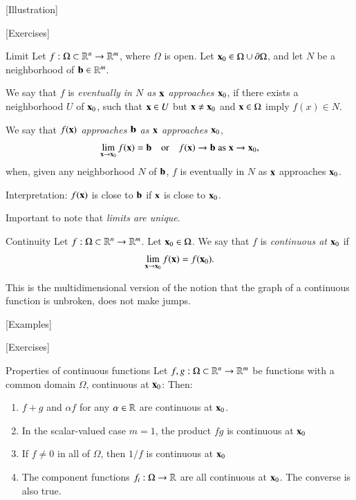 [Illustration]

[Exercises]

\begin{myDefinition}{Limit}{}
    Let $f : \Omega \subset \mathbb{R}^n \to \mathbb{R}^m$, where $\Omega$ is open. Let $\mathbf{x}_0\in \Omega \cup \partial\Omega$, and let $N$ be a neighborhood of $\mathbf{b}\in \mathbb{R}^m$.

    We say that $f$ is \emph{eventually in $N$ as $\mathbf{x}$ approaches $\mathbf{x}_0$}, if there exists a neighborhood $U$ of $\mathbf{x}_0$, such that $\mathbf{x}
    \in U$ but $\mathbf{x}\neq\mathbf{x}_0$ and $\mathbf{x}\in \Omega$ imply $f(x)\in N$.

    We say that \emph{$f(\mathbf{x})$ approaches $\mathbf{b}$ as $\mathbf{x}$ approaches $\mathbf{x}_0$},
    \begin{equation}
        \lim_{\mathbf{x}\to\mathbf{x}_0} f(\mathbf{x}) = \mathbf{b} \quad\text{or}\quad f(\mathbf{x}) \to \mathbf{b} \; \text{as} \; \mathbf{x}\to\mathbf{x}_0,
    \end{equation}
    when, given any neighborhood $N$ of $\mathbf{b}$, $f$ is eventually in $N$ as $\mathbf{x}$ approaches $\mathbf{x}_0$.
\end{myDefinition}

Interpretation: $f(\mathbf{x})$ is close to $\mathbf{b}$ if $\mathbf{x}$ is close to $\mathbf{x}_0$.

Important to note that \emph{limits are unique}.

\begin{myDefinition}{Continuity}{}
    Let $f : \Omega \subset \mathbb{R}^n\to\mathbb{R}^m$. Let $\mathbf{x}_0\in\Omega$. We say that $f$ is \emph{continuous at $\mathbf{x}_0$} if
    \begin{equation}
        \lim_{\mathbf{x}\to\mathbf{x}_0} f(\mathbf{x}) = f(\mathbf{x}_0).
    \end{equation}
\end{myDefinition}

This is the multidimensional version of the notion that the graph of a continuous function is unbroken, does not make jumps.

[Examples]

[Exercises]

\begin{myTheorem}{Properties of continuous functions}{}
Let $f, g : \Omega\subset\mathbb{R}^n \to \mathbb{R}^m$ be functions with a common domain $\Omega$, continuous at $\mathbf{x}_0$:
Then:
\begin{enumerate}
    \item $f+g$ and $\alpha f$ for any $\alpha\in\mathbb{R}$ are continuous at $\mathbf{x}_0$.
    \item In the scalar-valued case $m=1$, the product $fg$ is continuous at $\mathbf{x}_0$
    \item If $f \neq 0$ in all of $\Omega$, then $1/f$ is continuous at $\mathbf{x}_0$
    \item The component functions $f_i : \Omega \to \mathbb{R}$ are all continuous at $\mathbf{x}_0$. The converse is also true.
\end{enumerate}  
\end{myTheorem}


